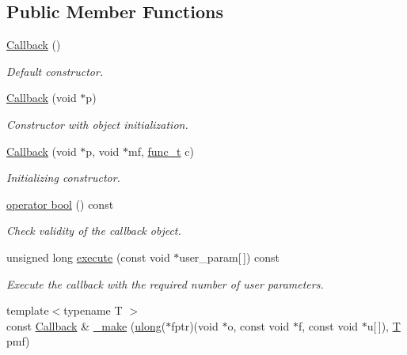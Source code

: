 \subsection*{Public Member Functions}
\begin{DoxyCompactItemize}
\item 
\hyperlink{class_d_d4hep_1_1_callback_af29b371d4eb53f3e27df8c3250899950}{Callback} ()
\begin{DoxyCompactList}\small\item\em Default constructor. \end{DoxyCompactList}\item 
\hyperlink{class_d_d4hep_1_1_callback_a11bd26d9c2634ea669f13d30d1462f8e}{Callback} (void $\ast$p)
\begin{DoxyCompactList}\small\item\em Constructor with object initialization. \end{DoxyCompactList}\item 
\hyperlink{class_d_d4hep_1_1_callback_ad9377008515da7c31829f8f1c77c0be8}{Callback} (void $\ast$p, void $\ast$mf, \hyperlink{class_d_d4hep_1_1_callback_a1f07e4c890067fde0b3ff1ad94e72a34}{func\+\_\+t} c)
\begin{DoxyCompactList}\small\item\em Initializing constructor. \end{DoxyCompactList}\item 
\hyperlink{class_d_d4hep_1_1_callback_a896830a0a56f01764333fa090fe45561}{operator bool} () const
\begin{DoxyCompactList}\small\item\em Check validity of the callback object. \end{DoxyCompactList}\item 
unsigned long \hyperlink{class_d_d4hep_1_1_callback_a899fb435d038824e54e1fbcbb04fa8ef}{execute} (const void $\ast$user\+\_\+param\mbox{[}$\,$\mbox{]}) const
\begin{DoxyCompactList}\small\item\em Execute the callback with the required number of user parameters. \end{DoxyCompactList}\item 
{\footnotesize template$<$typename T $>$ }\\const \hyperlink{class_d_d4hep_1_1_callback}{Callback} \& \hyperlink{class_d_d4hep_1_1_callback_ab64f1022925b766ce1b4b190bb486110}{\+\_\+make} (\hyperlink{class_d_d4hep_1_1_callback_ac676aa0685e2ba51bac69c33f8066431}{ulong}($\ast$fptr)(void $\ast$o, const void $\ast$f, const void $\ast$u\mbox{[}$\,$\mbox{]}), \hyperlink{class_t}{T} pmf)

\end{DoxyCompactItemize}
